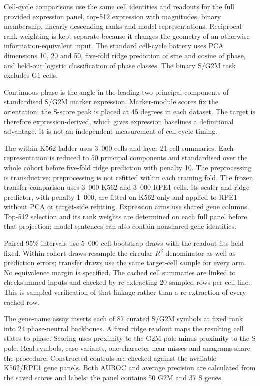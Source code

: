 \documentclass[review,authoryear,12pt]{elsarticle}
\begin{document}
Cell-cycle comparisons use the same cell identities and readouts for the full provided expression panel,
top-512 expression with magnitudes, binary membership, linearly descending ranks and model
representations. Reciprocal-rank weighting is kept separate because it changes the geometry of an
otherwise information-equivalent input. The standard cell-cycle battery uses PCA dimensions
10, 20 and 50, five-fold ridge prediction of sine and cosine of phase, and held-out logistic
classification of phase classes. The binary S/G2M task excludes G1 cells.

Continuous phase is the angle in the leading two principal components of standardised S/G2M
marker expression. Marker-module scores fix the orientation; the S-score peak is placed at
45 degrees in each dataset. The target is therefore expression-derived, which gives expression
baselines a definitional advantage. It is not an independent measurement of cell-cycle timing.

The within-K562 ladder uses 3~000 cells and layer-21 cell summaries. Each representation is
reduced to 50 principal components and standardised over the whole cohort before five-fold
ridge prediction with penalty 10. The preprocessing is transductive;
preprocessing is not refitted within each training fold. The frozen transfer comparison uses
3~000 K562 and 3~000 RPE1 cells. Its scaler and ridge predictor, with penalty 1~000, are fitted
on K562 only and applied to RPE1 without PCA or target-side refitting. Expression arms use
shared gene columns. Top-512 selection and its rank weights are determined on each full panel
before that projection; model sentences can also contain nonshared gene identities.

Paired 95\% intervals use 5~000 cell-bootstrap draws with the readout fits held fixed.
Within-cohort draws resample the circular-$R^2$ denominator as well as prediction errors;
transfer draws use the same target-cell sample for every arm. No equivalence margin is specified.
The cached cell summaries are linked to checksummed inputs and checked by re-extracting 20 sampled
rows per cell line. This is sampled verification of that linkage rather than a re-extraction of
every cached row.

The gene-name assay inserts each of 87 curated S/G2M symbols at fixed rank into 24 phase-neutral
backbones. A fixed ridge readout maps the resulting cell states to phase. Scoring uses proximity
to the G2M pole minus proximity to the S pole. Real symbols, case variants, one-character
near-misses and anagrams share the procedure. Constructed controls are checked against the
available K562/RPE1 gene panels. Both AUROC and average precision are calculated from the saved
scores and labels; the panel contains 50 G2M and 37 S genes.
\end{document}
